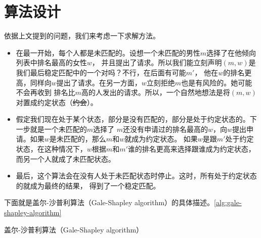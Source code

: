 \section{算法设计}\label{sec:stable-matching-algorithm}
    依据上文提到的问题，我们来考虑一下求解方法。
    \begin{itemize}[label=$\ast$]
        \item 在最一开始，每个人都是未匹配的。设想一个未匹配的男性$m$选择了在他倾向列表中排名最高的女性$w$，
            并且提出了请求。所以我们能立刻声明$(m,w)$是我们最后稳定匹配中的一个对吗？不行，在后面有可能$m'$，
            他在$w$的排名更高，同样向$w$提出了请求。在另一方面，$w$立刻拒绝$m$也是有风险的。她可能不会再收到
            排名比$m$高的人发出的请求。所以，一个自然地想法是将$(m,w)$对置成约定状态（\sout{约会}）。
        \item 假定我们现在处于某个状态，部分是没有匹配的，部分是处于约定状态的。下一步就是一个未匹配的$m$选择了
            $m$还没有申请过的排名最高的$w$，向$w$提出申请。如果$w$是未匹配的，那么$m$和$w$就成为约定状态。
            如果$w$是跟$m'$处于约定状态，在这种情况下，$w$根据$m$和$m'$谁的排名更高来选择跟谁成为约定状态，
            而另一个人就成了未匹配状态。
        \item 最后，这个算法会在没有人处于未匹配状态时停止。这时，所有处于约定状态的就成为最终的结果，
            得到了一个稳定匹配。
    \end{itemize}
    下面就是盖尔-沙普利算法（Gale-Shapley algorithm）的具体描述。\ref{alg:gale-shapley-algorithm}
    \begin{algorithm}
        \caption{盖尔-沙普利算法（Gale-Shapley algorithm）}\label{alg:gale-shapley-algorithm}
    \end{algorithm}

